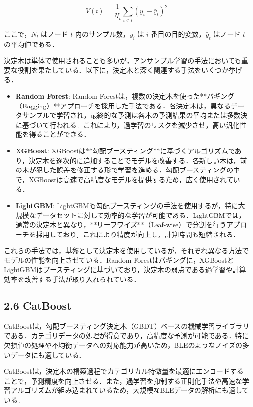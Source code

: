 \begin{equation}
	V(t) = \frac{1}{N_t} \sum_{i \in t} (y_i - \bar{y}_t)^2
\end{equation}

ここで，$N_t$ はノード $t$ 内のサンプル数，$y_i$ は $i$ 番目の目的変数，$\bar{y}_t$ はノード $t$ の平均値である．


決定木は単体で使用されることも多いが，アンサンブル学習の手法においても重要な役割を果たしている．以下に，決定木と深く関連する手法をいくつか挙げる．

\begin{itemize}
	\item \textbf{Random Forest}: 
	Random Forestは，複数の決定木を使った**バギング（Bagging）**アプローチを採用した手法である．各決定木は，異なるデータサンプルで学習され，最終的な予測は各木の予測結果の平均または多数決に基づいて行われる．これにより，過学習のリスクを減少させ，高い汎化性能を得ることができる．
	
	\item \textbf{XGBoost}:
	XGBoostは**勾配ブースティング**に基づくアルゴリズムであり，決定木を逐次的に追加することでモデルを改善する．各新しい木は，前の木が犯した誤差を修正する形で学習を進める．勾配ブースティングの中で，XGBoostは高速で高精度なモデルを提供するため，広く使用されている．
	
	\item \textbf{LightGBM}:
	LightGBMも勾配ブースティングの手法を使用するが，特に大規模なデータセットに対して効率的な学習が可能である．LightGBMでは，通常の決定木と異なり，**リーフワイズ**（Leaf-wise）で分割を行うアプローチを採用しており，これにより精度が向上し，計算時間も短縮される．
\end{itemize}

これらの手法では，基盤として決定木を使用しているが，それぞれ異なる方法でモデルの性能を向上させている．Random Forestはバギングに，XGBoostとLightGBMはブースティングに基づいており，決定木の弱点である過学習や計算効率を改善する手法が取り入れられている．

\subsection*{2.6 CatBoost}
CatBoostは，勾配ブースティング決定木（GBDT）ベースの機械学習ライブラリである．カテゴリデータの処理が得意であり，高精度な予測が可能である．特に欠損値の処理や不均衡データへの対応能力が高いため，BLEのようなノイズの多いデータにも適している．

CatBoostは，決定木の構築過程でカテゴリカル特徴量を最適にエンコードすることで，予測精度を向上させる．また，過学習を抑制する正則化手法や高速な学習アルゴリズムが組み込まれているため，大規模なBLEデータの解析にも適している．

